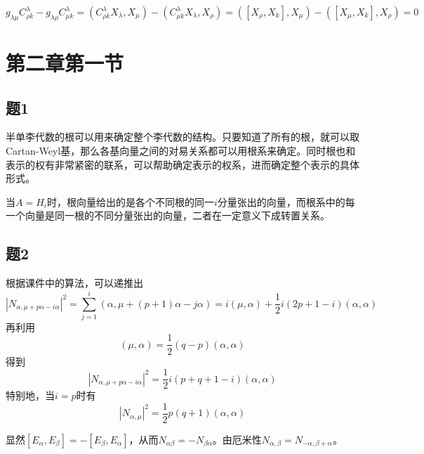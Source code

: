 \documentclass{ctexart}
\begin{document}
	\begin{equation}
	g_{\lambda\mu}C^{\lambda}_{\rho k}-g_{\lambda\rho}C^{\lambda}_{\mu k}=(C^\lambda_{\rho k}X_\lambda,X_\mu)-(C^{\lambda}_{\mu k}X_\lambda,X_\rho)=([X_\rho,X_k],X_\mu)-([X_\mu,X_k],X_\rho)=0
	\end{equation}
	
	\section{第二章第一节}
	
	\subsection{题1}
	
	半单李代数的根可以用来确定整个李代数的结构。只要知道了所有的根，就可以取Cartan-Weyl基，那么各基向量之间的对易关系都可以用根系来确定。同时根也和表示的权有非常紧密的联系，可以帮助确定表示的权系，进而确定整个表示的具体形式。
	
	当$A=H_i$时，根向量给出的是各个不同根的同一$i$分量张出的向量，而根系中的每一个向量是同一根的不同分量张出的向量，二者在一定意义下成转置关系。
	
	\subsection{题2}
	
	根据课件中的算法，可以递推出
	\begin{equation}
	|N_{\alpha,\mu+p\alpha-i\alpha}|^2=\sum_{j=1}^i(\alpha,\mu+(p+1)\alpha-j\alpha)=i(\mu,\alpha)+\frac{1}{2}i(2p+1-i)(\alpha,\alpha)
	\end{equation}
	再利用
	\begin{equation}
	(\mu,\alpha)=\frac{1}{2}(q-p)(\alpha,\alpha)
	\end{equation}
	得到
	\begin{equation}
	|N_{\alpha,\mu+p\alpha-i\alpha}|^2=\frac{1}{2}i(p+q+1-i)(\alpha,\alpha)
	\end{equation}
	特别地，当$i=p$时有
	\begin{equation}
	|N_{\alpha,\mu}|^2=\frac{1}{2}p(q+1)(\alpha,\alpha)
	\end{equation}
	
	显然$[E_\alpha,E_\beta]=-[E_\beta,E_\alpha]$，从而$N_{\alpha\beta}=-N_{\beta\alpha}$。由厄米性$N_{\alpha,\beta}=N_{-\alpha,\beta+\alpha}$。
	
\end{document}
